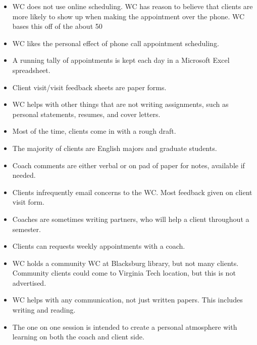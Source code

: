 \documentclass[12pt]{article} %
\begin{document}
\begin{itemize}
    \item WC does not use online scheduling.  WC has reason to believe that clients are more likely to show up when making the appointment over the phone.  WC bases this off of the about 50%
     
    \item WC likes the personal effect of phone call appointment scheduling.
     
    \item A running tally of appointments is kept each day in a Microsoft Excel spreadsheet.
     
    \item Client visit/visit feedback sheets are paper forms.
     
    \item WC helps with other things that are not writing assignments, such as personal statements, resumes, and cover letters.
     
    \item Most of the time, clients come in with a rough draft.
    
    \item The majority of clients are English majors and graduate students.
     
    \item Coach comments are either verbal or on pad of paper for notes, available if needed.
     
    \item Clients infrequently email concerns to the WC.  Most feedback given on client visit form.
     
    \item Coaches are sometimes writing partners, who will help a client throughout a semester.
     
    \item Clients can requests weekly appointments with a coach.
     
    \item WC holds a community WC at Blacksburg library, but not many clients.  Community clients could come to Virginia Tech location, but this is not advertised. 
     
    \item WC helps with any communication, not just written papers.  This includes writing and reading.
     
    \item The one on one session is intended to create a personal atmosphere with learning on both the coach and client side.
     

\end{itemize}
\end{document}
